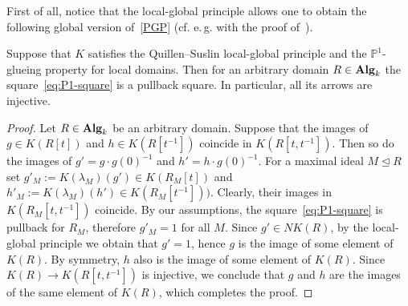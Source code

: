 \documentclass[oneside, 11pt]{amsart} \pdfoutput=1
\begin{document}
First of all, notice that the local-global principle allows one to obtain the following global version of~\ref{PGP} (cf. e.\,g. with the proof of~\cite[Theorem~1]{LS20}). 
\begin{lemma} \label{ght}
Suppose that $K$ satisfies the Quillen--Suslin local-global principle and the $\mathbb{P}^1$-glueing property for local domains. Then for an arbitrary domain $R \in {\normalfont\textbf{Alg}}_k$ the square~\eqref{eq:P1-square} is a pullback square. In particular, all its arrows are injective. \end{lemma}
\begin{proof}
Let $R \in {\normalfont\textbf{Alg}}_k$ be an arbitrary domain. Suppose that the images of $g \in K(R[t])$ and $h \in K(R[t^{-1}])$ coincide in $K(R[t, t^{-1}])$. Then so do the images of $g' = g \cdot g(0)^{-1}$ and $h' = h \cdot g(0)^{-1}$. For a maximal ideal $M\trianglelefteq R$ set $g'_M := K(\lambda_M)(g') \in K(R_M[t])$ and $h'_M := K(\lambda_M)(h') \in K(R_M[t^{-1}]))$. Clearly, their images in $K(R_M[t, t^{-1}])$ coincide. By our assumptions, the square~\eqref{eq:P1-square} is pullback for $R_M$, therefore $g'_M = 1$ for all $M$. Since $g' \in NK(R)$, by the local-global principle we obtain that $g' = 1$, hence $g$ is the image of some element of $K(R)$. By symmetry, $h$ also is the image of some element of $K(R)$. Since $K(R)\to K(R[t, t^{-1}])$ is injective, we conclude that $g$ and $h$ are the images of the same element of $K(R)$, which completes the proof.  \end{proof}
\end{document}
